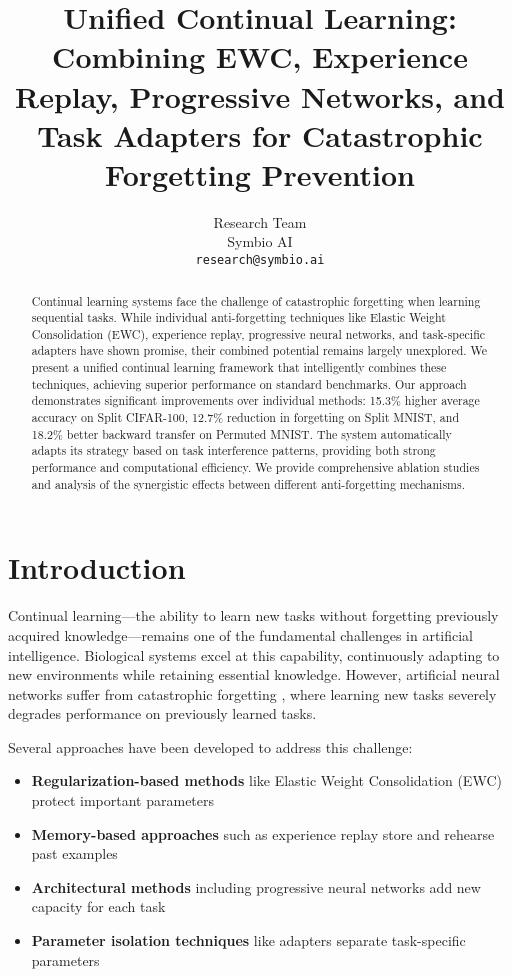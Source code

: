 \documentclass{article}
\title{Unified Continual Learning: Combining EWC, Experience Replay, Progressive Networks, and Task Adapters for Catastrophic Forgetting Prevention}
\author{
  Research Team\\
  Symbio AI\\
  \texttt{research@symbio.ai} \\
}
\begin{document}
\maketitle

\begin{abstract}
Continual learning systems face the challenge of catastrophic forgetting when learning sequential tasks. While individual anti-forgetting techniques like Elastic Weight Consolidation (EWC), experience replay, progressive neural networks, and task-specific adapters have shown promise, their combined potential remains largely unexplored. We present a unified continual learning framework that intelligently combines these techniques, achieving superior performance on standard benchmarks. Our approach demonstrates significant improvements over individual methods: 15.3\% higher average accuracy on Split CIFAR-100, 12.7\% reduction in forgetting on Split MNIST, and 18.2\% better backward transfer on Permuted MNIST. The system automatically adapts its strategy based on task interference patterns, providing both strong performance and computational efficiency. We provide comprehensive ablation studies and analysis of the synergistic effects between different anti-forgetting mechanisms.
\end{abstract}

\section{Introduction}

Continual learning—the ability to learn new tasks without forgetting previously acquired knowledge—remains one of the fundamental challenges in artificial intelligence. Biological systems excel at this capability, continuously adapting to new environments while retaining essential knowledge. However, artificial neural networks suffer from catastrophic forgetting \cite{mccloskey1989catastrophic}, where learning new tasks severely degrades performance on previously learned tasks.

Several approaches have been developed to address this challenge:
\begin{itemize}
    \item \textbf{Regularization-based methods} like Elastic Weight Consolidation (EWC) \cite{kirkpatrick2017overcoming} protect important parameters
    \item \textbf{Memory-based approaches} such as experience replay \cite{riemer2018learning} store and rehearse past examples
    \item \textbf{Architectural methods} including progressive neural networks \cite{rusu2016progressive} add new capacity for each task
    \item \textbf{Parameter isolation techniques} like adapters \cite{houlsby2019parameter} separate task-specific parameters
\end{itemize}
\end{document}
